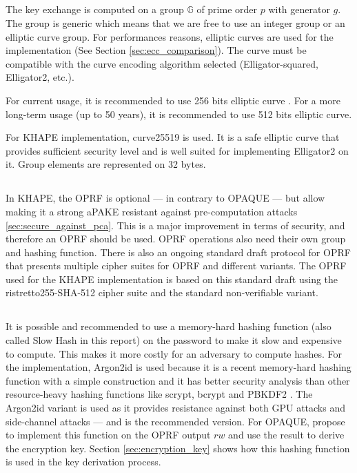 ﻿\documentclass[../report.tex]{subfiles}
\begin{document}
\subsection{}
The key exchange is computed on a group $\mathbb{G}$ of prime order $p$ with generator $g$.
The group is generic which means that we are free to use an integer group or an elliptic curve group.
For performances reasons, elliptic curves are used for the implementation (See Section \ref{sec:ecc_comparison}).
The curve must be compatible with the curve encoding algorithm selected (Elligator-squared, Elligator2, etc.).

For current usage, it is recommended to use 256 bits elliptic curve \cite{ECRYPT_Keylength}. For a more long-term usage (up to 50 years), it is recommended to use 512 bits elliptic curve.

For KHAPE implementation, curve25519 is used. It is a safe elliptic curve that provides sufficient security level and is well suited for implementing Elligator2 on it.
Group elements are represented on 32 bytes.


\subsection{} \label{sec:design_choice_oprf}
In KHAPE, the OPRF is optional --- in contrary to OPAQUE --- but allow making it a strong aPAKE resistant against pre-computation attacks \ref{sec:secure_against_pca}.
This is a major improvement in terms of security, and therefore an OPRF should be used.
OPRF operations also need their own group and hashing function.
There is also an ongoing standard draft protocol for OPRF \cite{VOPRF_Standard_Draft} that presents multiple cipher suites for OPRF and different variants.
The OPRF used for the KHAPE implementation is based on this standard draft using the ristretto255-SHA-512 cipher suite and the standard non-verifiable variant. %


\subsection{} \label{sec:design_choice_slowhash}
It is possible and recommended to use a memory-hard hashing function (also called Slow Hash in this report) on the password to make it slow and expensive to compute. 
This makes it more costly for an adversary to compute hashes.
For the implementation, Argon2id \cite{Argon2_Paper} is used because it is a recent memory-hard hashing function with a simple construction and it has better security analysis than other resource-heavy hashing functions like scrypt, bcrypt and PBKDF2 \cite{CAA}. The Argon2id variant is used as it provides resistance against both GPU attacks and side-channel attacks --- and is the recommended version.
For OPAQUE, \cite{OPAQUE_Standard_Draft} propose to implement this function on the OPRF output $rw$ and use the result to derive the encryption key. Section \ref{sec:encryption_key} shows how this hashing function is used in the key derivation process.
\end{document}
